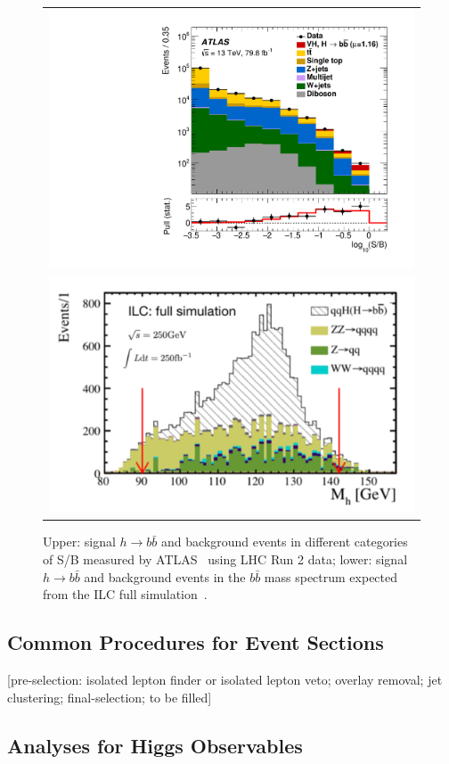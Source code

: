 \begin{figure}
\begin{tabular}[c]{c}
\includegraphics[width=0.85\hsize]{chapters/figures/ATLAS_VH_bb.pdf} \\
\includegraphics[width=0.85\hsize]{chapters/figures/qqH_bb250_ILC.pdf}
\end{tabular}
  \caption{Upper: signal $h\to b\bar{b}$ and background events in different categories of S/B
  measured by ATLAS~\cite{} using LHC Run 2 data; lower: signal $h\to b\bar{b}$ 
  and background events in the $b\bar{b}$ mass spectrum expected from the 
  ILC full simulation~\cite{}.}
  \label{fig:LHCILCHbb}
\end{figure}


\subsection{Common Procedures for Event Sections}
[pre-selection: isolated lepton finder or isolated lepton veto; overlay removal; jet clustering; 
final-selection; to be filled]

\subsection{Analyses for Higgs Observables}

